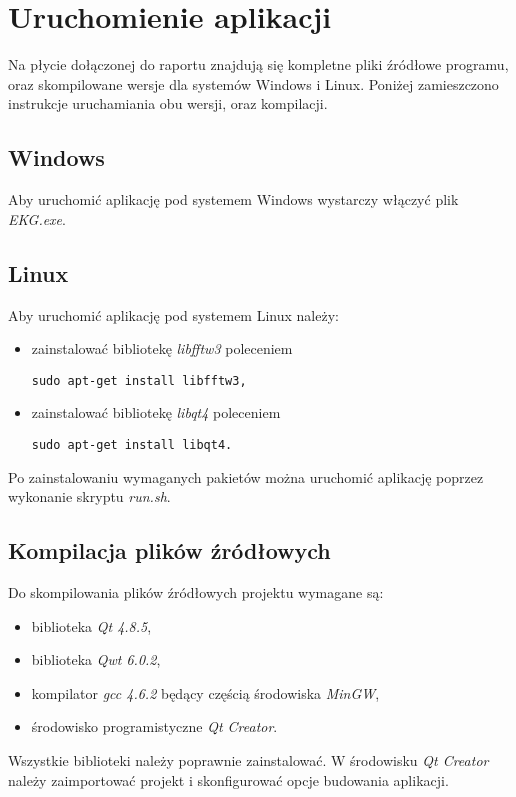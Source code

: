 \section{Uruchomienie aplikacji}
Na płycie dołączonej do raportu znajdują się kompletne pliki źródłowe programu, oraz skompilowane wersje dla systemów Windows i Linux. Poniżej zamieszczono instrukcje uruchamiania obu wersji, oraz kompilacji.

\subsection{Windows}
Aby uruchomić aplikację pod systemem Windows wystarczy włączyć plik \emph{EKG.exe}.

\subsection{Linux}
Aby uruchomić aplikację pod systemem Linux należy:
\begin{itemize}
\item zainstalować bibliotekę \emph{libfftw3} poleceniem \begin{verbatim}sudo apt-get install libfftw3,\end{verbatim}
\item zainstalować bibliotekę \emph{libqt4} poleceniem \begin{verbatim}sudo apt-get install libqt4.\end{verbatim}
\end{itemize}
Po zainstalowaniu wymaganych pakietów można uruchomić aplikację poprzez wykonanie skryptu \emph{run.sh}.

\subsection{Kompilacja plików źródłowych}
Do skompilowania plików źródłowych projektu wymagane są:
\begin{itemize}
\item biblioteka \emph{Qt 4.8.5},
\item biblioteka \emph{Qwt 6.0.2},
\item kompilator \emph{gcc 4.6.2} będący częścią środowiska \emph{MinGW},
\item środowisko programistyczne \emph{Qt Creator}.
\end{itemize}
Wszystkie biblioteki należy poprawnie zainstalować. W środowisku \emph{Qt Creator} należy zaimportować projekt i skonfigurować opcje budowania aplikacji.